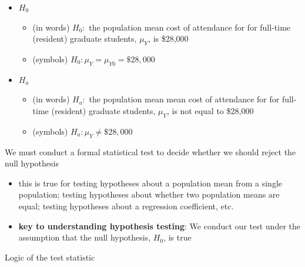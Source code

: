 \documentclass[
  letterpaper,
  DIV=11,
  numbers=noendperiod]{scrartcl}
\providecommand{\tightlist}{%
  \setlength{\itemsep}{0pt}\setlength{\parskip}{0pt}}\usepackage{longtable,booktabs,array}
\begin{document}
\begin{itemize}
\tightlist
\item
  \(H_0\)

  \begin{itemize}
  \tightlist
  \item
    (in words) \(H_0:\) the population mean cost of attendance for for
    full-time (resident) graduate students, \(\mu_Y\), is \$28,000
  \item
    (symbols) \(H_0: \mu_Y = \mu_{Y0} = \$28,000\)
  \end{itemize}
\item
  \(H_a\)

  \begin{itemize}
  \tightlist
  \item
    (in words) \(H_a:\) the population mean mean cost of attendance for
    for full-time (resident) graduate students, \(\mu_Y\), is not equal
    to \$28,000
  \item
    (symbols) \(H_a: \mu_Y \ne \$28,000\)
  \end{itemize}
\end{itemize}

We must conduct a formal statistical test to decide whether we should
reject the null hypothesis

\begin{itemize}
\tightlist
\item
  this is true for testing hypotheses about a population mean from a
  single population; testing hypotheses about whether two population
  means are equal; testing hypotheses about a regression coefficient,
  etc.
\item
  \textbf{key to understanding hypothesis testing}: We conduct our test
  under the assumption that the null hypothesis, \(H_0\), is true
\end{itemize}

Logic of the test statistic
\end{document}
